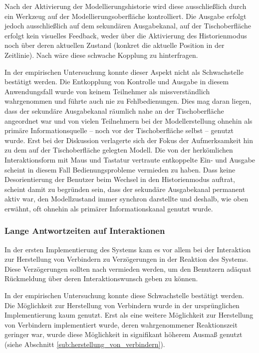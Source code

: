 Nach der Aktivierung der Modellierungshistorie wird diese ausschließlich durch ein Werkzeug auf der Modellierungsoberfläche kontrolliert. Die Ausgabe erfolgt jedoch ausschließlich auf dem sekundären Ausgabekanal, auf der Tischoberfläche erfolgt kein visuelles Feedback, weder über die Aktivierung des Historienmodus noch über deren aktuellen Zustand (konkret die aktuelle Position in der Zeitlinie). Nach \citet{Ullmer00} wäre diese schwache Kopplung zu hinterfragen.

In der empirischen Untersuchung konnte dieser Aspekt nicht als Schwachstelle bestätigt werden. Die Entkopplung von Kontrolle und Ausgabe in diesem Anwendungsfall wurde von keinem Teilnehmer als missverständlich wahrgenommen und führte auch nie zu Fehlbedienungen. Dies mag daran liegen, dass der sekundäre Ausgabekanal räumlich nahe an der Tischoberfläche angeordnet war und von vielen Teilnehmern bei der Modellerstellung ohnehin als primäre Informationsquelle -- noch vor der Tischoberfläche selbst -- genutzt wurde. Erst bei der Diskussion verlagerte sich der Fokus der Aufmerksamkeit hin zu dem auf der Tischoberfläche gelegten Modell. Die von der herkömlichen Interaktionsform mit Maus und Tastatur vertraute entkoppelte Ein- und Ausgabe scheint in diesem Fall Bedienungsprobleme vermieden zu haben. Dass keine Desorientierung der Benutzer beim Wechsel in den Historienmodus auftrat, scheint damit zu begründen sein, dass der sekundäre Ausgabekanal permanent aktiv war, den Modellzustand immer synchron darstellte und deshalb, wie oben erwähnt, oft ohnehin als primärer Informationskanal genutzt wurde.  

\subsubsection{Lange Antwortzeiten auf Interaktionen}

In der ersten Implementierung des Systems kam es vor allem bei der Interaktion zur Herstellung von Verbindern zu Verzögerungen in der Reaktion des Systems. Diese Verzögerungen sollten nach \citet{Bellotti02} vermieden werden, um den Benutzern adäquat Rückmeldung über deren Interaktionswunsch geben zu können.

In der empirischen Untersuchung konnte diese Schwachstelle bestätigt werden. Die Möglichkeit zur Herstellung von Verbindern wurde in der ursprünglichen Implementierung kaum genutzt. Erst als eine weitere Möglichkeit zur Herstellung von Verbindern implementiert wurde, deren wahrgenommener Reaktionszeit geringer war, wurde diese Möglichkeit in signifikant höherem Ausmaß genutzt (siehe Abschnitt \ref{sub:herstellung_von_verbindern}).

